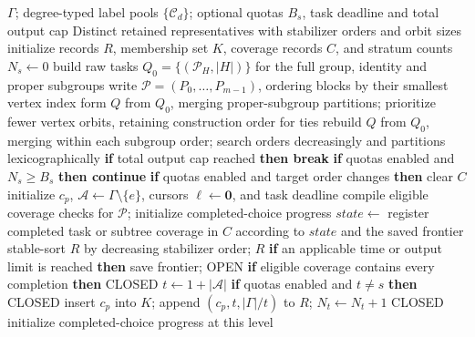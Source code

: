 \documentclass[a5paper, 10pt]{article}
\begin{document}
\begin{algorithm}[H]
\caption{Subgroup-Lattice Descent}
\label{alg:enum}
\scriptsize
\setlength{\baselineskip}{7.1pt}
\begin{algorithmic}[1]
\Require $\Gamma$; degree-typed label pools $\{\mathcal C_d\}$; optional quotas $B_s$, task deadline and total output cap
\Ensure Distinct retained representatives with stabilizer orders and orbit sizes
\State initialize records $R$, membership set $K$, coverage records $C$, and stratum counts $N_s\gets0$
\State build raw tasks $Q_0=\{(\mathcal P_H,|H|)\}$ for the full group, identity and proper subgroups
\State write $\mathcal P=(P_0,\ldots,P_{m-1})$, ordering blocks by their smallest vertex index
\State form $Q$ from $Q_0$, merging proper-subgroup partitions; prioritize fewer vertex orbits, retaining construction order for ties
  \State rebuild $Q$ from $Q_0$, merging within each subgroup order; search orders decreasingly and partitions lexicographically
\EndIf
{}
  \State \textbf{if} total output cap reached \textbf{then break}
  \State \textbf{if} quotas enabled and $N_s\ge B_s$ \textbf{then continue}
  \State \textbf{if} quotas enabled and target order changes \textbf{then} clear $C$
  \State initialize $c_p$, $\mathcal A\gets\Gamma\setminus\{e\}$, cursors $\boldsymbol\ell\gets\mathbf0$, and task deadline
  \State compile eligible coverage checks for $\mathcal P$; initialize completed-choice progress
  \State $state\gets$ 
  \State register completed task or subtree coverage in $C$ according to $state$ and the saved frontier
\EndFor
\State stable-sort $R$ by decreasing stabilizer order; \Return $R$
\Statex
{}
  \State \textbf{if} an applicable time or output limit is reached \textbf{then} save frontier; \Return OPEN
  \State \textbf{if} eligible coverage contains every completion \textbf{then} \Return CLOSED
    \State $t\gets1+|\mathcal A|$
    \State \textbf{if} quotas enabled and $t\ne s$ \textbf{then} \Return CLOSED
      \State insert $c_p$ into $K$; append $(c_p,t,|\Gamma|/t)$ to $R$; $N_t\gets N_t+1$
    \EndIf
    \State \Return CLOSED
  \EndIf
  \State initialize completed-choice progress at this level

\end{algorithmic}
\end{algorithm}
\end{document}
